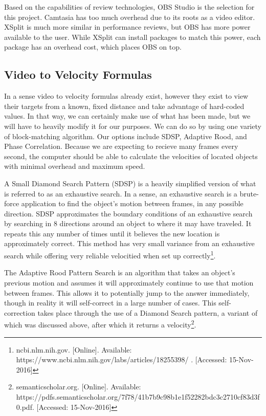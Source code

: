 \documentclass[letterpaper,10pt,onecolumn,draftclsnofoot]{IEEEtran}
\begin{document}
Based on the capabilities of review technologies, OBS Studio is the selection for this project.  Camtasia has too much overhead due to its roots as a video editor.  XSplit is much more similar in performance reviews, but OBS has more power available to the user.  While XSplit can install packages to match this power, each package has an overhead cost, which places OBS on top.

\newpage
\subsection{Video to Velocity Formulas} %

In a sense video to velocity formulas already exist, however they exist to view their targets from a known, fixed distance and take advantage of hard-coded values.  In that way, we can certainly make use of what has been made, but we will have to heavily modify it for our purposes.  We can do so by using one variety of block-matching algorithm.  Our options include SDSP, Adaptive Rood, and Phase Correlation.  Because we are expecting to recieve many frames every second, the computer should be able to calculate the velocities of located objects with minimal overhead and maximum speed.

A Small Diamond Search Pattern (SDSP) is a heavily simplified version of what is referred to as an exhaustive search.  In a sense, an exhaustive search is a brute-force application to find the object's motion between frames, in any possible direction.  SDSP approximates the boundary conditions of an exhaustive search by searching in 8 directions around an object to where it may have traveled.  It repeats this any number of times until it believes the new location is approximately correct.  This method has very small variance from an exhaustive search while offering very reliable velocitied when set up correctly\footnote{ncbi.nlm.nih.gov. [Online]. Available: https://www.ncbi.nlm.nih.gov/labs/articles/18255398/ . [Accessed: 15-Nov-2016] }.

The Adaptive Rood Pattern Search is an algorithm that takes an object's previous motion and assumes it will approximately continue to use that motion between frames.  This allows it to potentially jump to the answer immediately, though in reality it will self-correct in a large number of cases.  This self-correction takes place through the use of a Diamond Search pattern, a variant of which was discussed above, after which it returns a velocity\footnote{semanticscholar.org. [Online]. Available: https://pdfs.semanticscholar.org/7f78/41b7b9c98b1e1f52282bdc3c2710cf83d3f0.pdf. [Accessed: 15-Nov-2016] }.
\end{document}
